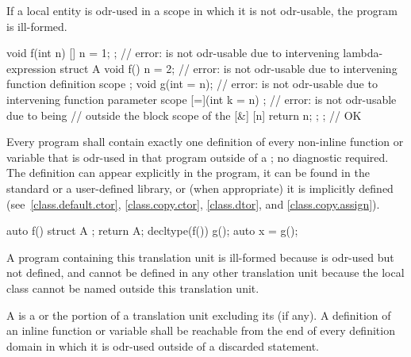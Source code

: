 If a local entity is odr-used
in a scope in which it is not odr-usable,
the program is ill-formed.
\begin{example}
\begin{codeblock}
void f(int n) {
  [] { n = 1; };                // error:  is not odr-usable due to intervening lambda-expression
  struct A {
    void f() { n = 2; }         // error:  is not odr-usable due to intervening function definition scope
  };
  void g(int = n);              // error:  is not odr-usable due to intervening function parameter scope
  [=](int k = n) {};            // error:  is not odr-usable due to being
                                // outside the block scope of the 
  [&] { [n]{ return n; }; };    // OK
}
\end{codeblock}
\end{example}

\pnum
Every program shall contain exactly one definition of every non-inline
function or variable that is odr-used in that program
outside of a ; no diagnostic required.
The definition can appear explicitly in the program, it can be found in
the standard or a user-defined library, or (when appropriate) it is
implicitly defined (see~\ref{class.default.ctor}, \ref{class.copy.ctor},
\ref{class.dtor}, and \ref{class.copy.assign}).
\begin{example}
\begin{codeblock}
auto f() {
  struct A {};
  return A{};
}
decltype(f()) g();
auto x = g();
\end{codeblock}
A program containing this translation unit is ill-formed
because  is odr-used but not defined,
and cannot be defined in any other translation unit
because the local class  cannot be named outside this
translation unit.
\end{example}

\pnum
A  is
a  or
the portion of a translation unit
excluding its  (if any).
A definition of an inline function or variable shall be reachable
from the end of every definition domain
in which it is odr-used outside of a discarded statement.


